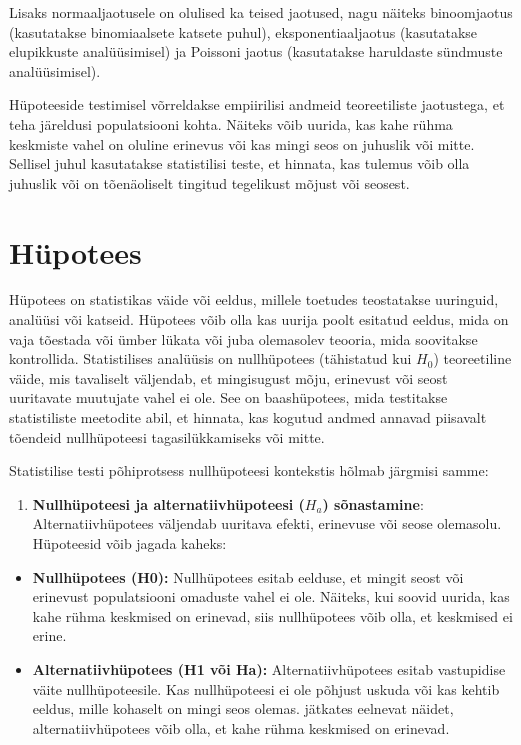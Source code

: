 \documentclass[
]{book}
\providecommand{\tightlist}{%
  \setlength{\itemsep}{0pt}\setlength{\parskip}{0pt}}
\begin{document}
Lisaks normaaljaotusele on olulised ka teised jaotused, nagu näiteks binoomjaotus (kasutatakse binomiaalsete katsete puhul), eksponentiaaljaotus (kasutatakse elupikkuste analüüsimisel) ja Poissoni jaotus (kasutatakse haruldaste sündmuste analüüsimisel).

Hüpoteeside testimisel võrreldakse empiirilisi andmeid teoreetiliste jaotustega, et teha järeldusi populatsiooni kohta. Näiteks võib uurida, kas kahe rühma keskmiste vahel on oluline erinevus või kas mingi seos on juhuslik või mitte. Sellisel juhul kasutatakse statistilisi teste, et hinnata, kas tulemus võib olla juhuslik või on tõenäoliselt tingitud tegelikust mõjust või seosest.

\section{Hüpotees}\label{huxfcpotees}

Hüpotees on statistikas väide või eeldus, millele toetudes teostatakse uuringuid, analüüsi või katseid. Hüpotees võib olla kas uurija poolt esitatud eeldus, mida on vaja tõestada või ümber lükata või juba olemasolev teooria, mida soovitakse kontrollida. Statistilises analüüsis on nullhüpotees (tähistatud kui \(H_0\)) teoreetiline väide, mis tavaliselt väljendab, et mingisugust mõju, erinevust või seost uuritavate muutujate vahel ei ole. See on baashüpotees, mida testitakse statistiliste meetodite abil, et hinnata, kas kogutud andmed annavad piisavalt tõendeid nullhüpoteesi tagasilükkamiseks või mitte.

Statistilise testi põhiprotsess nullhüpoteesi kontekstis hõlmab järgmisi samme:

\begin{enumerate}
\def\labelenumi{\arabic{enumi}.}
\tightlist
\item
  \textbf{Nullhüpoteesi ja alternatiivhüpoteesi (\(H_a\)) sõnastamine}: Alternatiivhüpotees väljendab uuritava efekti, erinevuse või seose olemasolu. Hüpoteesid võib jagada kaheks:
\end{enumerate}

\begin{itemize}
\item
  \textbf{Nullhüpotees (H0):} Nullhüpotees esitab eelduse, et mingit seost või erinevust populatsiooni omaduste vahel ei ole. Näiteks, kui soovid uurida, kas kahe rühma keskmised on erinevad, siis nullhüpotees võib olla, et keskmised ei erine.
\item
  \textbf{Alternatiivhüpotees (H1 või Ha):} Alternatiivhüpotees esitab vastupidise väite nullhüpoteesile. Kas nullhüpoteesi ei ole põhjust uskuda või kas kehtib eeldus, mille kohaselt on mingi seos olemas. jätkates eelnevat näidet, alternatiivhüpotees võib olla, et kahe rühma keskmised on erinevad.
\end{itemize}
\end{document}
